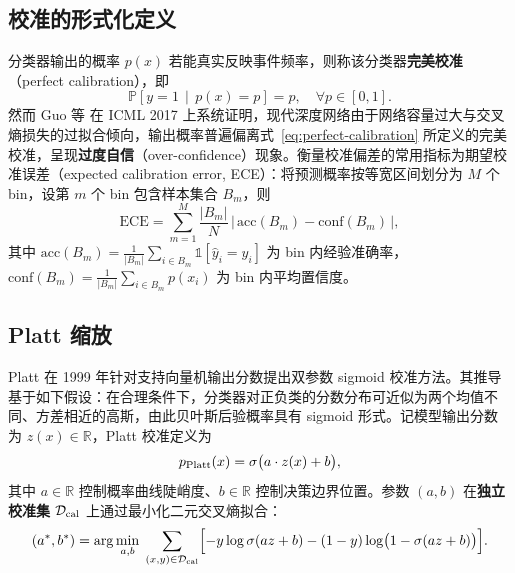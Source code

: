 \documentclass[UTF8,openany,12pt]{ctexbook}
\begin{document}
\subsection{校准的形式化定义}
分类器输出的概率 $p(x)$ 若能真实反映事件频率，则称该分类器\textbf{完美校准}（perfect calibration），即
\begin{equation}
\mathbb{P}\!\left[y = 1 \,\middle|\, p(x) = p\right] = p, \quad \forall p \in [0, 1].
\label{eq:perfect-calibration}
\end{equation}
然而 Guo 等\cite{guo2017calibration} 在 ICML 2017 上系统证明，现代深度网络由于网络容量过大与交叉熵损失的过拟合倾向，输出概率普遍偏离式~\eqref{eq:perfect-calibration} 所定义的完美校准，呈现\textbf{过度自信}（over-confidence）现象。衡量校准偏差的常用指标为期望校准误差（expected calibration error, ECE）：将预测概率按等宽区间划分为 $M$ 个 bin，设第 $m$ 个 bin 包含样本集合 $B_m$，则
\begin{equation}
\mathrm{ECE} = \sum_{m=1}^{M} \frac{|B_m|}{N} \,\bigl|\,\mathrm{acc}(B_m) - \mathrm{conf}(B_m)\,\bigr|,
\label{eq:ece}
\end{equation}
其中 $\mathrm{acc}(B_m) = \frac{1}{|B_m|}\sum_{i \in B_m} \mathbb{1}[\hat{y}_i = y_i]$ 为 bin 内经验准确率，$\mathrm{conf}(B_m) = \frac{1}{|B_m|}\sum_{i \in B_m} p(x_i)$ 为 bin 内平均置信度。

\subsection{Platt 缩放}
Platt\cite{platt1999probabilistic} 在 1999 年针对支持向量机输出分数提出双参数 sigmoid 校准方法。其推导基于如下假设：在合理条件下，分类器对正负类的分数分布可近似为两个均值不同、方差相近的高斯，由此贝叶斯后验概率具有 sigmoid 形式。记模型输出分数为 $z(x) \in \mathbb{R}$，Platt 校准定义为
\begin{equation}
p_{\rm Platt}(x) = \sigma\bigl(a\cdot z(x) + b\bigr),
\label{eq:platt}
\end{equation}
其中 $a \in \mathbb{R}$ 控制概率曲线陡峭度、$b \in \mathbb{R}$ 控制决策边界位置。参数 $(a, b)$ 在\textbf{独立校准集} $\mathcal{D}_{\rm cal}$ 上通过最小化二元交叉熵拟合：
\begin{equation}
(a^{\ast}, b^{\ast}) = \arg\min_{a, b}\; \sum_{(x, y) \in \mathcal{D}_{\rm cal}} \Bigl[-y\log \sigma(az+b) - (1-y)\log\bigl(1 - \sigma(az+b)\bigr)\Bigr].
\label{eq:platt-nll}
\end{equation}
\end{document}
